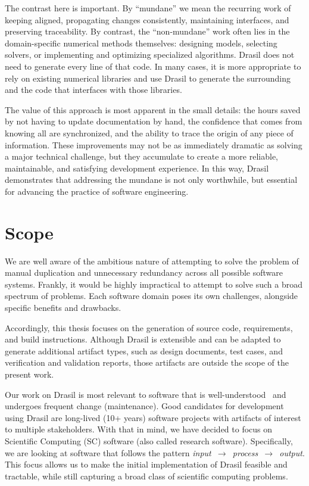 The contrast here is important. By ``mundane'' we mean the recurring work of
keeping \sfs{} aligned, propagating changes consistently, maintaining
interfaces, and preserving traceability. By contrast, the ``non-mundane'' work
often lies in the domain-specific numerical methods themselves: designing
models, selecting solvers, or implementing and optimizing specialized
algorithms. Drasil does not need to generate every line of that code. In many
cases, it is more appropriate to rely on existing numerical libraries and use
Drasil to generate the surrounding \sfs{} and the code that interfaces with
those libraries.

The value of this approach is most apparent in the small details: the hours
saved by not having to update documentation by hand, the confidence that comes
from knowing all \sfs{} are synchronized, and the ability to trace the
origin of any piece of information. These improvements may not be as
immediately dramatic as solving a major technical challenge, but they
accumulate to create a more reliable, maintainable, and satisfying development
experience. In this way, Drasil demonstrates that addressing the mundane is not
only worthwhile, but essential for advancing the practice of software
engineering.

\section{Scope}
\label{sec:scope}
We are well aware of the ambitious nature of attempting to solve the problem of
manual duplication and unnecessary redundancy across all possible software
systems. Frankly, it would be highly impractical to attempt to solve such a
broad spectrum of problems. Each software domain poses its own challenges,
alongside specific benefits and drawbacks. 

Accordingly, this thesis focuses on the generation of source code,
requirements, and build instructions. Although Drasil is extensible and can be
adapted to generate additional artifact types, such as design documents, test
cases, and verification and validation reports, those artifacts are outside the
scope of the present work.

Our work on Drasil is most relevant to software that is 
well-understood~\citep{CaretteEtAl2023} and undergoes frequent change
(maintenance). Good candidates for development using Drasil are long-lived (10+ 
years) software projects with artifacts of interest to multiple stakeholders. 
With that in mind, we have decided to focus on Scientific Computing (SC) 
software (also called research software). Specifically, we are looking at 
software that follows the pattern 
\mbox{\emph{input~$\rightarrow$~process~$\rightarrow$~output}}. This focus 
allows us to make the initial implementation of Drasil feasible and tractable, 
while still capturing a broad class of scientific computing problems.

